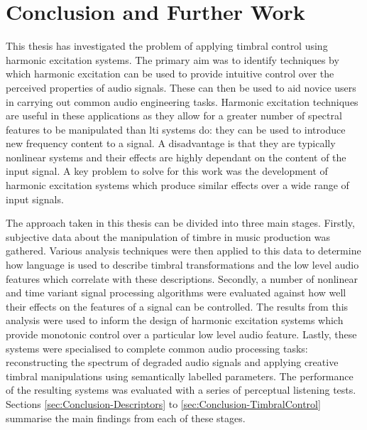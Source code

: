 \chapter{Conclusion and Further Work}
\label{chap:Conclusion}

	This thesis has investigated the problem of applying timbral control using harmonic excitation systems. The primary
	aim was to identify techniques by which harmonic excitation can be used to provide intuitive control over the
	perceived properties of audio signals. These can then be used to aid novice users in carrying out common audio
	engineering tasks. Harmonic excitation techniques are useful in these applications as they allow for a greater
	number of spectral features to be manipulated than \acrshort{lti} systems do: they can be used to introduce new
	frequency content to a signal. A disadvantage is that they are typically nonlinear systems and their effects are
	highly dependant on the content of the input signal. A key problem to solve for this work was the development of
	harmonic excitation systems which produce similar effects over a wide range of input signals.

	The approach taken in this thesis can be divided into three main stages. Firstly, subjective data about the
	manipulation of timbre in music production was gathered. Various analysis techniques were then applied to this data
	to determine how language is used to describe timbral transformations and the low level audio features which
	correlate with these descriptions. Secondly, a number of nonlinear and time variant signal processing algorithms
	were evaluated against how well their effects on the features of a signal can be controlled. The results from this
	analysis were used to inform the design of harmonic excitation systems which provide monotonic control over a
	particular low level audio feature. Lastly, these systems were specialised to complete common audio processing
	tasks: reconstructing the spectrum of degraded audio signals and applying creative timbral manipulations using
	semantically labelled parameters. The performance of the resulting systems was evaluated with a series of perceptual
	listening tests. Sections \ref{sec:Conclusion-Descriptors} to \ref{sec:Conclusion-TimbralControl} summarise the main
	findings from each of these stages.

